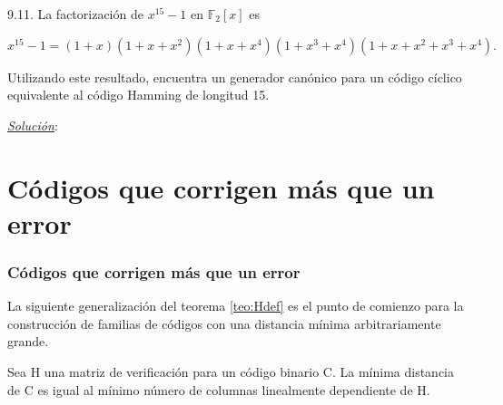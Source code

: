 \begin{frame}  \small \begin{ejercicio} 

9.11. La factorización de $x^{15}-1$ en $\mathbb{F}_2[x]$ es

 \begin{center}
$x^{15}-1 = (1+x)(1+x+x^2)(1+x+x^4)(1+x^3+x^4)(1+x+x^2+x^3+x^4). $
\end{center}
 
 Utilizando este resultado, encuentra un generador canónico para un código cíclico equivalente al código Hamming de longitud 15.
 

\end{ejercicio} \pause \textit{\underline{Solución}}:\\ \end{frame} 

\section{Códigos que corrigen más que un error}

\begin{frame}  \frametitle{Códigos que corrigen más que un error}\small  

La siguiente generalización del teorema \ref{teo:Hdef} es el punto de comienzo para la construcción de familias de códigos con una distancia mínima arbitrariamente grande.

\begin{teorema}

Sea H una matriz de verificación para un código binario C. La mínima distancia de C es igual al mínimo número de columnas linealmente dependiente de H.

\end{teorema}


\end{frame} 



